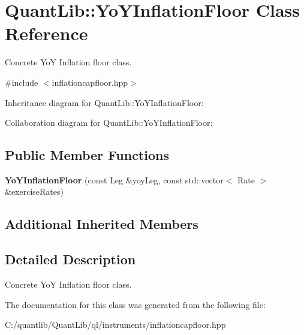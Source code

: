 \section{Quant\+Lib\+:\+:Yo\+Y\+Inflation\+Floor Class Reference}
\label{class_quant_lib_1_1_yo_y_inflation_floor}


Concrete YoY Inflation floor class.  




{\ttfamily \#include $<$inflationcapfloor.\+hpp$>$}



Inheritance diagram for Quant\+Lib\+:\+:Yo\+Y\+Inflation\+Floor\+:


Collaboration diagram for Quant\+Lib\+:\+:Yo\+Y\+Inflation\+Floor\+:
\subsection*{Public Member Functions}
\begin{DoxyCompactItemize}
\item 
{\bfseries Yo\+Y\+Inflation\+Floor} (const Leg \&yoy\+Leg, const std\+::vector$<$ Rate $>$ \&exercise\+Rates)\label{class_quant_lib_1_1_yo_y_inflation_floor_a1f0820d119e521529fb60aa31732812b}

\end{DoxyCompactItemize}
\subsection*{Additional Inherited Members}


\subsection{Detailed Description}
Concrete YoY Inflation floor class. 



The documentation for this class was generated from the following file\+:\begin{DoxyCompactItemize}
\item 
C\+:/quantlib/\+Quant\+Lib/ql/instruments/inflationcapfloor.\+hpp\end{DoxyCompactItemize}
